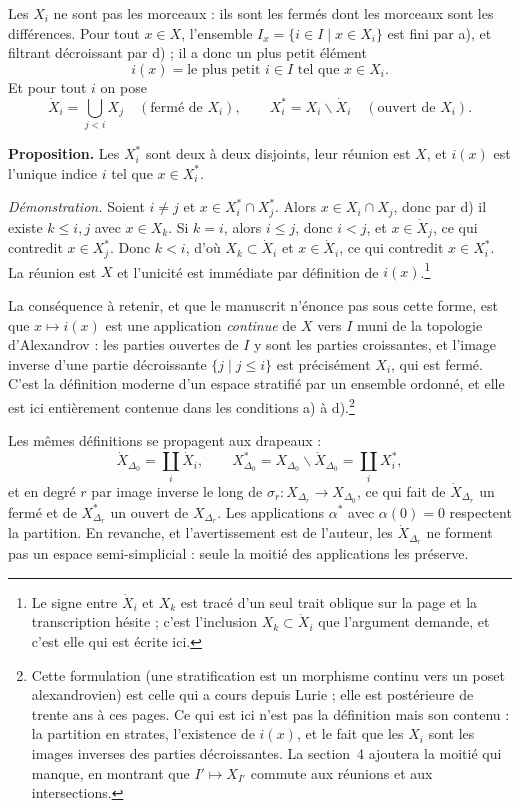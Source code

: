 \documentclass[11pt,a4paper]{article}
\begin{document}
Les $X_{i}$ ne sont pas les morceaux : ils sont les fermés dont les morceaux sont
les différences. Pour tout $x \in X$, l'ensemble $I_{x} = \{ i \in I \mid x \in
X_{i}\}$ est fini par a), et filtrant décroissant par d) ; il a donc un plus
petit élément
\[
  i(x) = \text{le plus petit } i \in I \text{ tel que } x \in X_{i}.
\]
Et pour tout $i$ on pose
\[
  \dot{X}_{i} = \bigcup_{j < i} X_{j} \quad (\text{fermé de } X_{i}),
  \qquad
  X_{i}^{*} = X_{i} \smallsetminus \dot{X}_{i} \quad (\text{ouvert de } X_{i}).
\]

\textbf{Proposition.} Les $X_{i}^{*}$ sont deux à deux disjoints, leur réunion
est $X$, et $i(x)$ est l'unique indice $i$ tel que $x \in X_{i}^{*}$.

\emph{Démonstration.} Soient $i \neq j$ et $x \in X_{i}^{*} \cap X_{j}^{*}$.
Alors $x \in X_{i} \cap X_{j}$, donc par d) il existe $k \leq i,j$ avec
$x \in X_{k}$. Si $k = i$, alors $i \leq j$, donc $i < j$, et $x \in \dot{X}_{j}$,
ce qui contredit $x \in X_{j}^{*}$. Donc $k < i$, d'où $X_{k} \subset \dot{X}_{i}$
et $x \in \dot{X}_{i}$, ce qui contredit $x \in X_{i}^{*}$. La réunion est $X$ et
l'unicité est immédiate par définition de $i(x)$.\footnote{Le signe entre
$\dot{X}_{i}$ et $X_{k}$ est tracé d'un seul trait oblique sur la page et la
transcription hésite ; c'est l'inclusion $X_{k} \subset \dot{X}_{i}$ que
l'argument demande, et c'est elle qui est écrite ici.}

La conséquence à retenir, et que le manuscrit n'énonce pas sous cette forme,
est que $x \mapsto i(x)$ est une application \emph{continue} de $X$ vers $I$
muni de la topologie d'Alexandrov : les parties ouvertes de $I$ y sont les
parties croissantes, et l'image inverse d'une partie décroissante
$\{ j \mid j \leq i \}$ est précisément $X_{i}$, qui est fermé. C'est la
définition moderne d'un espace stratifié par un ensemble ordonné, et elle est ici
entièrement contenue dans les conditions a) à d).\footnote{Cette formulation
(une stratification est un morphisme continu vers un poset alexandrovien) est
celle qui a cours depuis Lurie ; elle est postérieure de trente ans à ces pages.
Ce qui est ici n'est pas la définition mais son contenu : la partition en
strates, l'existence de $i(x)$, et le fait que les $X_{i}$ sont les images
inverses des parties décroissantes. La section~4 ajoutera la moitié qui manque,
en montrant que $I' \mapsto X_{I'}$ commute aux réunions et aux intersections.}

Les mêmes définitions se propagent aux drapeaux :
\[
  \dot{X}_{\Delta_{0}} = \coprod_{i} \dot{X}_{i}, \qquad
  X^{*}_{\Delta_{0}} = X_{\Delta_{0}} \smallsetminus \dot{X}_{\Delta_{0}}
  = \coprod_{i} X_{i}^{*},
\]
et en degré $r$ par image inverse le long de
$\sigma_{r} \colon X_{\Delta_{r}} \to X_{\Delta_{0}}$, ce qui fait de
$\dot{X}_{\Delta_{r}}$ un fermé et de $X^{*}_{\Delta_{r}}$ un ouvert de
$X_{\Delta_{r}}$. Les applications $\alpha^{*}$ avec $\alpha(0) = 0$ respectent
la partition. En revanche, et l'avertissement est de l'auteur, les
$\dot{X}_{\Delta_{r}}$ ne forment pas un espace semi-simplicial : seule la moitié
des applications les préserve.
\end{document}
